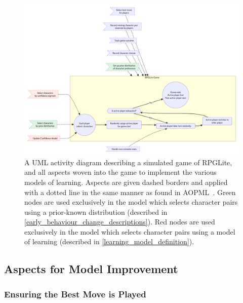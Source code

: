 \begin{figure}[h]
  \centering
  \includegraphics[width=\columnwidth]{60_optimisation_with_aspects/diagrams/aspect_applied_model.pdf}
  \caption{A UML activity diagram describing a simulated game of RPGLite, and
  all aspects woven into the game to implement the various models of learning.
  Aspects are given dashed borders and applied with a dotted line in the same
  manner as found in AOPML~\cite{Cappelli_AOBPM}. Green nodes are used
  exclusively in the model which selects character pairs using a prior-known
  distribution (described in \cref{early_behaviour_change_descriptions}). Red
  nodes are used exclusively in the model which selects character pairs using a
  model of learning (described in \cref{learning_model_definition}).}
  \label{fig:all_aspects_applied}
\end{figure}


\subsection{Aspects for Model Improvement}\label{subsec:aspects_improving_model}

\subsubsection{Ensuring the Best Move is Played}\label{aspect_to_ensure_best_move}



